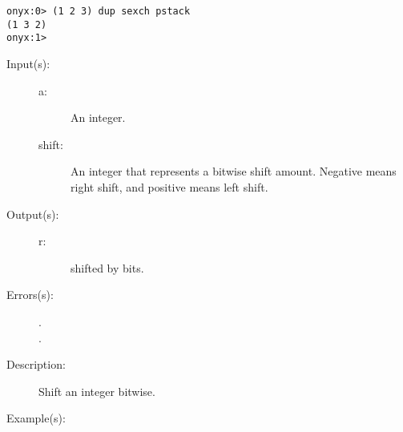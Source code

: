\begin{description}
\begin{description}
\begin{verbatim}
onyx:0> (1 2 3) dup sexch pstack
(1 3 2)
onyx:1>
		\end{verbatim}
	\end{description}
\label{systemdict:shift}
\item[{\onyxop{--}{shift}{--}}: ]
	\begin{description}\item[]
	\item[Input(s): ]
		\begin{description}\item[]
		\item[a: ]
			An integer.
		\item[shift: ]
			An integer that represents a bitwise shift amount.
			Negative means right shift, and positive means left
			shift.
		\end{description}
	\item[Output(s): ]
		\begin{description}\item[]
		\item[r: ]
			 shifted by  bits.
		\end{description}
	\item[Errors(s): ]
		\begin{description}\item[]
		\item[.]
		\item[.]
		\end{description}
	\item[Description: ]
		Shift an integer bitwise.
	\item[Example(s): ]\begin{verbatim}


\end{verbatim}
\end{description}
\end{description}
